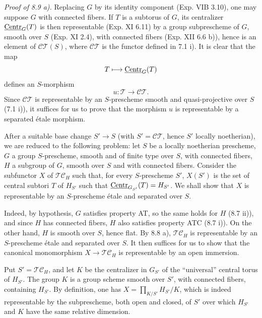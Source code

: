\par\noindent\emph{Proof of 8.9 a).}
Replacing $G$ by its identity component (Exp. VIB 3.10), one may suppose $G$ with connected fibers. If $T$ is a subtorus of $G$, its centralizer $\underline{\mathrm{Centr}}_G(T)$ is then representable (Exp. XI 6.11) by a group subprescheme of $G$, smooth over $S$ (Exp. XI 2.4), with connected fibers (Exp. XII 6.6 b)), hence is an element of $\mathscr{CT}(S)$, where $\mathscr{CT}$ is the functor defined in 7.1 i). It is clear that the map
\[
T\longmapsto\underline{\mathrm{Centr}}_G(T)
\]
defines an $S$-morphism
\[
u:\mathscr T\longrightarrow\mathscr{CT}.
\]
Since $\mathscr{CT}$ is representable by an $S$-prescheme smooth and quasi-projective over $S$ (7.1 i)), it suffices for us to prove that the morphism $u$ is representable by a separated étale morphism.

After a suitable base change $S'\to S$ (with $S'=\mathscr{CT}$, hence $S'$ locally noetherian), we are reduced to the following problem: let $S$ be a locally noetherian prescheme, $G$ a group $S$-prescheme, smooth and of finite type over $S$, with connected fibers, $H$ a subgroup of $G$, smooth over $S$ and with connected fibers. Consider the subfunctor $X$ of $\mathscr{TC}_H$ such that, for every $S$-prescheme $S'$, $X(S')$ is the set of central subtori $T$ of $H_{S'}$ such that $\underline{\mathrm{Centr}}_{G_{S'}}(T)=H_{S'}$. We shall show that $X$ is representable by an $S$-prescheme étale and separated over $S$.

Indeed, by hypothesis, $G$ satisfies property AT, so the same holds for $H$ (8.7 ii)), and since $H$ has connected fibers, $H$ also satisfies property ATC (8.7 i)). On the other hand, $H$ is smooth over $S$, hence flat. By 8.8 a), $\mathscr{TC}_H$ is representable by an $S$-prescheme étale and separated over $S$. It then suffices for us to show that the canonical monomorphism $X\to\mathscr{TC}_H$ is representable by an open immersion.

Put $S'=\mathscr{TC}_H$, and let $K$ be the centralizer in $G_{S'}$ of the ``universal'' central torus of $H_{S'}$. The group $K$ is a group scheme smooth over $S'$, with connected fibers, containing $H_{S'}$. By definition, one has $X=\prod_{K/S'}H_{S'}/K$, which is indeed representable by the subprescheme, both open and closed, of $S'$ over which $H_{S'}$ and $K$ have the same relative dimension.

